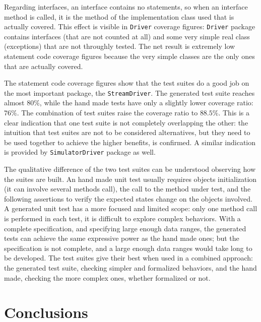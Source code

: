 \documentclass{article}
\newcommand{\lil}[1]{\texttt{\lstinline|#1|}}
\begin{document}
Regarding interfaces, an interface contains no statements, so when an interface method is called, it is the method of the implementation class used that is actually covered.
This effect is visible in \lil{Driver} coverage figures: \lil{Driver} package contains interfaces (that are not counted at all) and some very simple real class (exceptions) that are not throughly tested. 
The net result is extremely low statement code coverage figures because the very simple classes are the only ones that are actually covered. 

The statement code coverage figures show that the test suites do a good job on the most important package, the \lil{StreamDriver}. 
The generated test suite reaches almost $ 80 \% $, while the hand made tests have only a slightly lower coverage ratio: $ 76 \% $. 
The combination of test suites raise the coverage ratio to $ 88.5 \% $. 
This is a clear indication that one test suite is not completely overlapping the other: the intuition that test suites are not to be considered alternatives, but they need to be used together to achieve the higher benefits, is confirmed.
A similar indication is provided by \lil{SimulatorDriver} package as well.

The qualitative difference of the two test suites can be understood observing how the suites are built. 
An hand made unit test usually requires objects initialization (it can involve several methods call), the call to the method under test, and the following assertions to verify the expected states change on the objects involved. 
A generated unit test has a more focused and limited scope: only one method call is performed in each test, it is difficult to explore complex behaviors. 
With a complete specification, and specifying large enough data ranges, the generated tests can achieve the same expressive power as the hand made ones; but the specification is not complete, and a large enough data ranges would take long to be developed.
The test suites give their best when used in a combined approach: the generated test suite, checking simpler and formalized behaviors, and the hand made, checking the more complex ones, whether formalized or not.  



\section{Conclusions}
\label{sec:conclusions}
\end{document}
